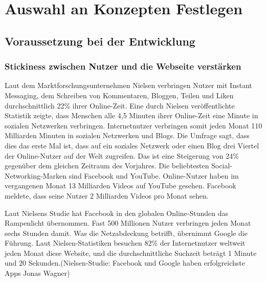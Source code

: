 
\chapter{Auswahl an Konzepten Festlegen}


\section{Voraussetzung bei der Entwicklung}


\subsection{Stickiness zwischen Nutzer und die Webseite verstärken}


Laut dem Marktforschungsunternehmen Nielsen verbringen Nutzer mit Instant Messaging, dem Schreiben von Kommentaren, Bloggen, Teilen und \glqq{}Liken\grqq{} durchschnittlich 22\% ihrer Online-Zeit. Eine durch Nielsen veröffentlichte Statistik zeigte, dass Menschen alle 4,5 Minuten ihrer Online-Zeit eine Minute in sozialen Netzwerken verbringen. Internetnutzer verbringen somit jeden Monat 110 Milliarden Minuten in sozialen Netzwerken und Blogs. Die Umfrage sagt, dass dies das erste Mal ist, dass auf ein soziales Netzwerk oder einen Blog \glqq{}drei Viertel der Online-Nutzer auf der Welt zugreifen.\grqq{} Das ist eine Steigerung von 24\% gegenüber dem gleichen Zeitraum des Vorjahres. Die beliebtesten Social-Networking-Marken sind Facebook und YouTube. Online-Nutzer haben im vergangenen Monat 13 Milliarden Videos auf YouTube gesehen. Facebook meldete, dass seine Nutzer 2 Milliarden Videos pro Monat sehen.


Laut Nielsens Studie hat Facebook in den globalen Online-Stunden das Rampenlicht übernommen. Fast 500 Millionen Nutzer verbringen jeden Monat sechs Stunden damit.
Was die Netzabdeckung betrifft, übernimmt Google die Führung. Laut Nielsen-Statistiken besuchen 82\% der Internetnutzer weltweit jeden Monat diese Website, und die durchschnittliche Suchzeit beträgt 1 Minute und 20 Sekunden.(Nielsen-Studie: Facebook und Google haben erfolgreichste Apps Jonas Wagner)

